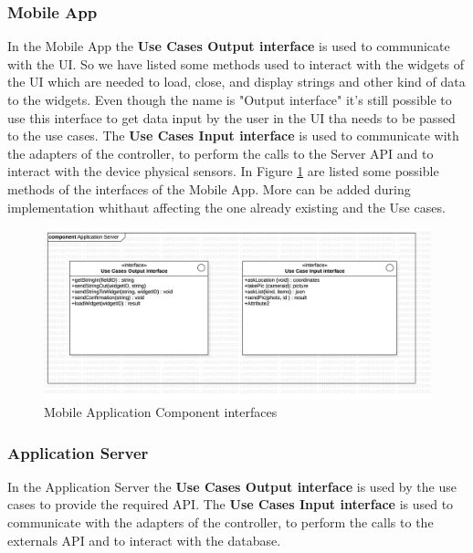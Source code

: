 \subsubsection{Mobile App}
In the Mobile App the \textbf{Use Cases Output interface} is used to communicate with the UI.
So we have listed some methods used to interact with the widgets of the UI which are needed to load, close, and display strings and other kind of data to the widgets. Even though the name is "Output interface" it's still possible to use this interface to get data input by the user in the UI tha needs to be passed to the use cases.
The \textbf{Use Cases Input interface} is used to communicate with the adapters of the controller, to perform the calls to the Server API and to interact with the device physical sensors.
In Figure \ref{fig:AppInterfaces} are listed some possible methods of the interfaces of the Mobile App. More can be added during implementation whithaut affecting the one already existing and the Use cases.

\begin{figure}[H]
\centering
\includegraphics[width=\textwidth]{Images/AppInterfaces.png}
\caption{\label{fig:AppInterfaces} Mobile Application Component interfaces}
\end{figure}

\subsubsection{Application Server}
In the Application Server the \textbf{Use Cases Output interface} is used by the use cases to provide the required API.
The \textbf{Use Cases Input interface} is used to communicate with the adapters of the controller, to perform the calls to the externals API and to interact with the database.

